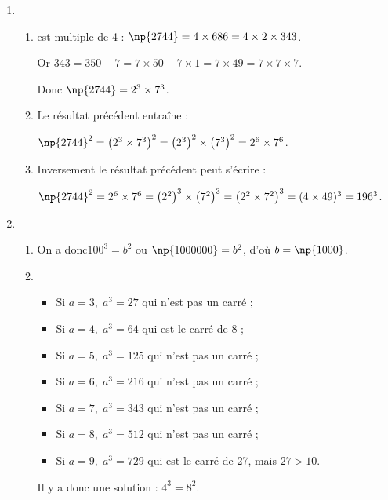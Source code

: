 
\medskip

\begin{enumerate}
\item 
	\begin{enumerate}
		\item %
 est multiple de 4 : $\np{2744} = 4 \times 686 = 4 \times 2 \times 343$.

Or $343 = 350 - 7 = 7\times 50 - 7\times 1 = 7 \times 49 = 7 \times 7 \times 7$.

Donc $\np{2744} = 2^3 \times 7^3$.
		\item %
Le résultat précédent entraîne :
		
$\np{2744}^2 = \left(2^3 \times 7^3 \right)^2 = \left(2^3 \right)^2 \times \left(7^3 \right)^2 = 2^6 \times 7^6$.
		\item %
Inversement le résultat précédent peut s'écrire :
		
$\np{2744}^2 = 2^6 \times 7^6 = \left(2^2 \right)^3 \times \left(7^2 \right)^3 = \left(2^2 \times 7^2 \right)^3 = (4 \times 49)^3 = 196^3$.		
	\end{enumerate}
\item %
	\begin{enumerate}
		\item %
On a donc$100^3 = b^2$ ou $\np{1000000} = b^2$, d'où $b = \np{1000}$.
		\item %
\begin{itemize}
\item Si $a = 3,\; a^3 = 27$ qui n'est pas un carré ;
\item Si $a = 4,\; a^3 = 64$ qui est le  carré de 8 ;
\item Si $a = 5,\; a^3 = 125$ qui n'est pas un carré ;
\item Si $a = 6,\; a^3 = 216$ qui n'est pas un carré ;
\item Si $a = 7,\; a^3 = 343$ qui n'est pas un carré ;
\item Si $a = 8,\; a^3 = 512$ qui n'est pas un carré ;
\item Si $a = 9,\; a^3 = 729$ qui est le  carré de 27, mais $27 > 10$.
\end{itemize}
	
Il y a donc une solution : $4^3 = 8^2$.	
	\end{enumerate}
\end{enumerate}

\bigskip

